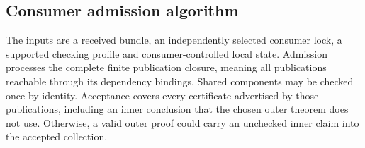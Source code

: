 \documentclass[11pt]{article}
\begin{document}
\subsection{Consumer admission algorithm}
\label{sec:admission}

The inputs are a received bundle, an independently selected consumer lock, a
supported checking profile and consumer-controlled local state. Admission
processes the complete finite publication closure, meaning all publications
reachable through its dependency bindings. Shared components may be checked
once by identity. Acceptance covers every certificate advertised by those
publications, including an inner conclusion that the chosen outer theorem
does not use. Otherwise, a valid outer proof could carry an unchecked inner
claim into the accepted collection.
\end{document}
